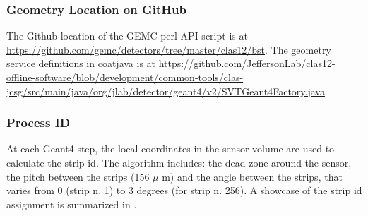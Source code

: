 \subsubsection{Geometry Location on GitHub}
The Github location of the GEMC perl API script is at \url{https://github.com/gemc/detectors/tree/master/clas12/bst}.
The geometry service definitions in coatjava is at
\url{https://github.com/JeffersonLab/clas12-offline-software/blob/development/common-tools/clas-jcsg/src/main/java/org/jlab/detector/geant4/v2/SVTGeant4Factory.java}


\subsubsection{Process ID}

At each Geant4 step, the local coordinates in the sensor volume are used to calculate the strip id.
The algorithm includes: the dead zone around the sensor, the pitch between the strips (156 $\mu$ m) and the angle
between the strips, that varies from 0 (strip n. 1) to 3 degrees (for strip n. 256). A showcase of the strip id assignment
is summarized in .

